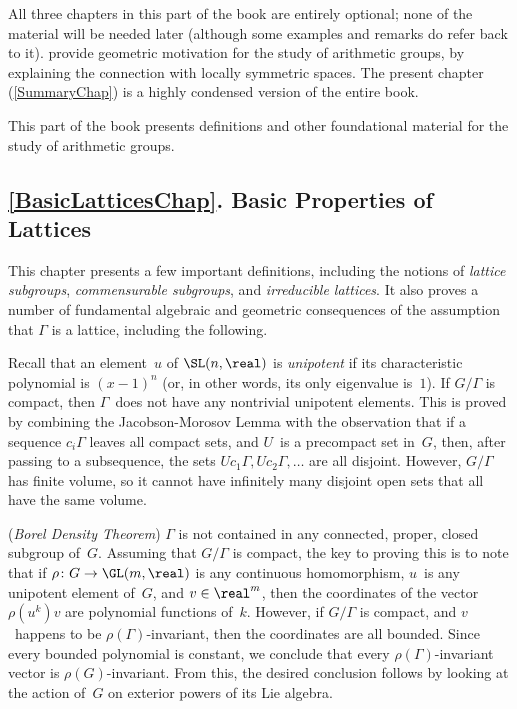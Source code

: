 All three chapters in this part of the book are entirely optional; none of the material will be needed later (although some examples and remarks do refer back to it).  provide geometric motivation for the study of arithmetic groups, by explaining the connection with locally symmetric spaces. The present chapter (\cref{SummaryChap}) is a highly condensed version of the entire book.




This part of the book presents definitions and other foundational material for the study of arithmetic groups.

\subsection*{\cref{BasicLatticesChap}. Basic Properties of Lattices} 
This chapter presents a few important definitions, including the notions of \emph{lattice subgroups}, \emph{commensurable subgroups}, and \emph{irreducible lattices}. It also proves a number of fundamental algebraic and geometric consequences of the assumption that $\Gamma$ is a lattice, including the following.

\smallbreak

 Recall that an element~$u$ of $\SL(n,\real)$ is \emph{unipotent} if its characteristic polynomial is $(x-1)^n$ (or, in other words, its only eigenvalue is~$1$).
If $G/\Gamma$ is compact, then $\Gamma$~does not have any nontrivial unipotent elements.
This is proved by combining the Jacobson-Morosov Lemma  with the observation that if a sequence $c_i \Gamma$ leaves all compact sets, and $U$~is a precompact set in~$G$, then, after passing to a subsequence, the sets $Uc_1 \Gamma, Uc_2 \Gamma, \ldots$ are all disjoint. However, $G/\Gamma$ has finite volume, so it cannot have infinitely many disjoint open sets that all have the same volume.

\smallbreak

 (\emph{Borel Density Theorem}) $\Gamma$ is not contained in any connected, proper, closed subgroup of~$G$. 
Assuming that $G/\Gamma$ is compact, the key to proving this is to note that if $\rho \colon G \to \GL(m,\real)$ is any continuous homomorphism, $u$~is any unipotent element of~$G$, and $v \in \real^m$, then the coordinates of the vector $\rho(u^k) v$ are polynomial functions of~$k$. However, if $G/\Gamma$ is compact, and $v$~happens to be $\rho(\Gamma)$-invariant, then the coordinates are all bounded. Since every bounded polynomial is constant, we conclude that every $\rho(\Gamma)$-invariant vector is $\rho(G)$-invariant. From this, the desired conclusion follows by looking at the action of~$G$ on exterior powers of its Lie algebra.


